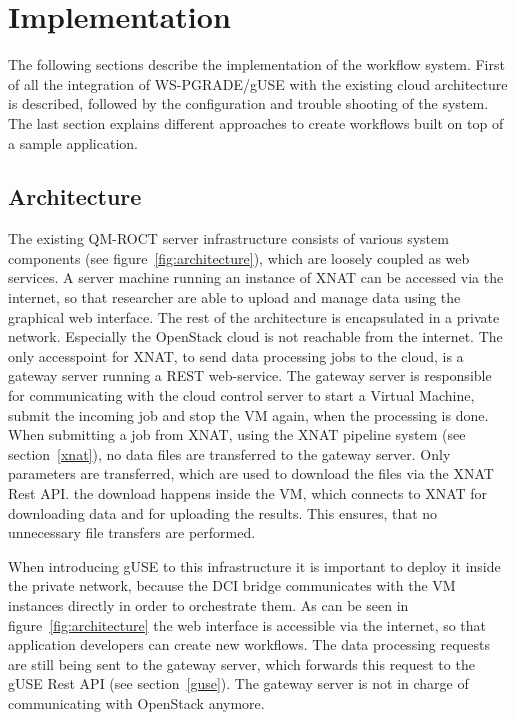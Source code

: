 \section{Implementation}\label{implementation}

The following sections describe the implementation of the workflow system.
First of all the integration of WS-PGRADE/gUSE with the existing cloud architecture is described, followed by the configuration and trouble shooting of the system.
The last section explains different approaches to create workflows built on top of a sample application.

\subsection{Architecture}\label{architecture}

The existing QM-ROCT server infrastructure consists of various system components (see figure~\ref{fig:architecture}), which are loosely coupled as web services.
A server machine running an instance of XNAT can be accessed via the internet, so that researcher are able to upload and manage data using the graphical web interface.
The rest of the architecture is encapsulated in a private network.
Especially the OpenStack cloud is not reachable from the internet. The only accesspoint for XNAT, to send data processing jobs to the cloud, is a gateway server running a REST web-service.
The gateway server is responsible for communicating with the cloud control server to start a Virtual Machine, submit the incoming job and stop the VM again, when the processing is done.
When submitting a job from XNAT, using the XNAT pipeline system (see section~\ref{xnat}), no data files are transferred to the gateway server.
Only parameters are transferred, which are used to download the files via the XNAT Rest API.
the download happens inside the VM, which connects to XNAT for downloading data and for uploading the results.
This ensures, that no unnecessary file transfers are performed. 

When introducing gUSE to this infrastructure it is important to deploy it inside the private network, because the DCI bridge communicates with the VM instances directly in order to orchestrate them.
As can be seen in figure~\ref{fig:architecture} the web interface is accessible via the internet, so that application developers can create new workflows.
The data processing requests are still being sent to the gateway server, which forwards this request to the gUSE Rest API (see section~\ref{guse}).
The gateway server is not in charge of communicating with OpenStack anymore.

